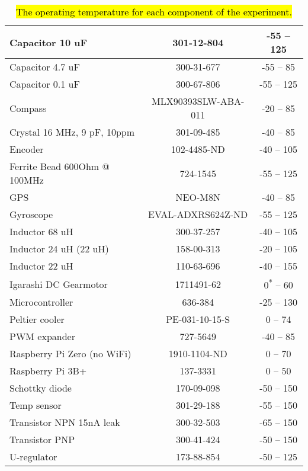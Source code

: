 \begin{center}
\begin{table}[H]
\begin{tabular}{ | l | c | c |}
    \hline
    Capacitor 10 uF & 301-12-804 & -55 – 125 \\ 
    \hline
    Capacitor 4.7 uF & 300-31-677 & -55 – 85 \\ 
    \hline
    Capacitor 0.1 uF & 300-67-806 & -55 – 125 \\ 
    \hline
    Compass & MLX90393SLW-ABA-011 & -20 – 85 \\ 
    \hline
    Crystal 16 MHz, 9 pF, 10ppm & 301-09-485 & -40 – 85 \\
    \hline
    Encoder & 102-4485-ND & -40 – 105 \\
    \hline
    Ferrite Bead 600Ohm @ 100MHz & 724-1545 & -55 – 125 \\
    \hline
    GPS & NEO-M8N & -40 – 85\\
    \hline
    Gyroscope & EVAL-ADXRS624Z-ND & -55 – 125 \\
    \hline
    Inductor 68 uH & 300-37-257 & -40 – 105 \\
    \hline
    Inductor 24 uH (22 uH) & 158-00-313 & -20 – 105 \\
    \hline
    Inductor 22 uH & 110-63-696 & -40 – 155\\
    \hline
    Igarashi DC Gearmotor & 1711491-62 & 0\textsuperscript{*} – 60 \\  
    \hline
    Microcontroller & 636-384 & -25 – 130 \\
    \hline
    Peltier cooler & PE-031-10-15-S & 0 – 74 \\
    \hline
    PWM expander & 727-5649 & -40 – 85 \\
    \hline
    Raspberry Pi Zero (no WiFi) & 1910-1104-ND & 0 – 70 \\
    \hline
    Raspberry Pi 3B+ & 137-3331 & 0 – 50 \\
    \hline
    Schottky diode & 170-09-098 & -50 – 150 \\
    \hline
    Temp sensor & 301-29-188 & -55 – 150 \\
    \hline
    Transistor NPN 15nA leak & 300-32-503 & -65 – 150 \\
    \hline
    Transistor PNP & 300-41-424 & -50 – 150 \\
    \hline
    U-regulator & 173-88-854 & -50 – 125\\
    \hline
\end{tabular}
\caption{\hl{The operating temperature for each component of the experiment.}}
\end{table}
\label{tab: temp ranges}
\end{center}